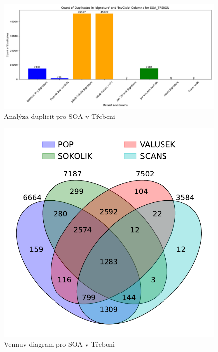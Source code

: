 \begin{figure}[htbp]
\centering
    \includegraphics[scale=.5]{obrazky-figures/dataAnalysis/soaTrebon/duplicities.pdf}
    \caption{Analýza duplicit pro SOA v Třeboni}
\end{figure}

\begin{figure}[htbp]
\centering
    \includegraphics[scale=.5]{obrazky-figures/dataAnalysis/soaTrebon/Venn_4.pdf}
    \caption{Vennuv diagram pro SOA v Třeboni}
\end{figure}


